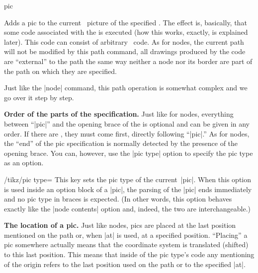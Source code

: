 \begin{pathoperation}{pic}{
    }
  
  Adds a pic to the current \tikzname\ picture of the specified
  . The effect is, basically, that some code associated
  with the  is executed (how this works, exactly, is explained
  later). This code can consist of arbitrary \tikzname\ code. As for
  nodes, the current path will not be modified by this path command,
  all drawings produced by the code are ``external'' to the path the
  same way neither a node nor its border are part of the path on which
  they are specified. 
  
  Just like the |node| command, this path operation is somewhat
  complex and we go over it step by step.

  \medskip
  \textbf{Order of the parts of the specification.}
  Just like for nodes, everything between ``|pic|'' and the opening
  brace of the  is optional and can be given in any
  order. If there are , they must come
  first, directly following ``|pic|.'' As for nodes, the ``end'' of
  the pic specification is normally detected by the presence of the
  opening brace. You can, however, use the |pic type|
  option to specify the pic type as an option.
  
  \begin{key}{/tikz/pic type=}
    This key sets the pic type of the current~|pic|. When this option
    is used inside an option block of a |pic|, the parsing of the
    |pic| ends immediately and no pic type in braces is expected. (In
    other words, this option behaves exactly like the |node contents|
    option and, indeed, the two are interchangeable.) 
\begin{codeexample}[]
\end{codeexample}
  \end{key}

  \medskip
  \textbf{The location of a pic.}
  Just like nodes, pics are placed at the last position mentioned on
  the path or, when |at| is used, at a specified position. ``Placing''
  a pic somewhere actually means that the coordinate system is
  translated (shifted) to this last position. This means that inside
  of the pic type's code any mentioning of the origin refers to the
  last position used on the path or to the specified |at|.


\end{pathoperation}
